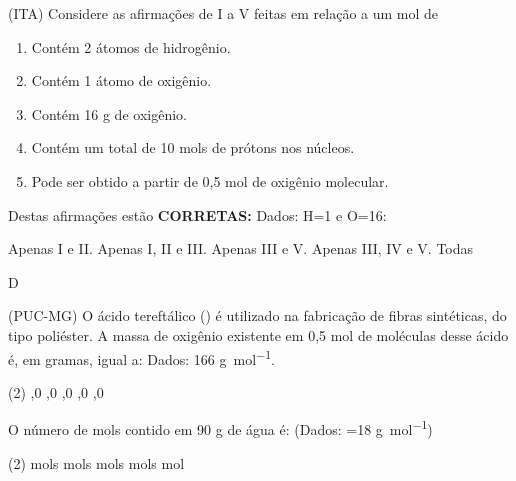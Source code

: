 \documentclass[11pt]{scrartcl}
\begin{document}
\begin{exercise}[points=1]
(ITA) Considere as afirmações de I a V feitas em relação a um mol de 

\begin{enumerate}[label=\Roman*]
\item Contém 2 átomos de hidrogênio.
\item Contém 1 átomo de oxigênio.
\item Contém 16 g de oxigênio.
\item Contém um total de 10 mols de prótons nos núcleos.
\item Pode ser obtido a partir de 0,5 mol de oxigênio molecular.
\end{enumerate}

Destas afirmações estão \textbf{CORRETAS:} Dados: H=1 e O=16:

\begin{choice}
\choice Apenas I e II.
\choice Apenas I, II e III.
\choice Apenas III e V.
\choice Apenas III, IV e V.
\choice Todas
\end{choice}
\end{exercise}
\begin{solution}
D
\end{solution}


\begin{exercise}[points=1]
(PUC-MG) O ácido tereftálico () é utilizado na fabricação de fibras sintéticas, do tipo poliéster. A massa de oxigênio existente em 0,5 mol de moléculas desse ácido é, em gramas, igual a: Dados:  166 \unit{\gram\per\mol}.

\begin{choice}(2)
,0
,0
,0
,0
,0
\end{choice}
\end{exercise}


\begin{exercise}[points=1]
O número de mols contido em 90 g de água é: (Dados: =18 \unit{\gram\per\mol})

\begin{choice}(2)
 mols
 mols
 mols
 mols
 mol
\end{choice}
\end{exercise}




\end{document}
